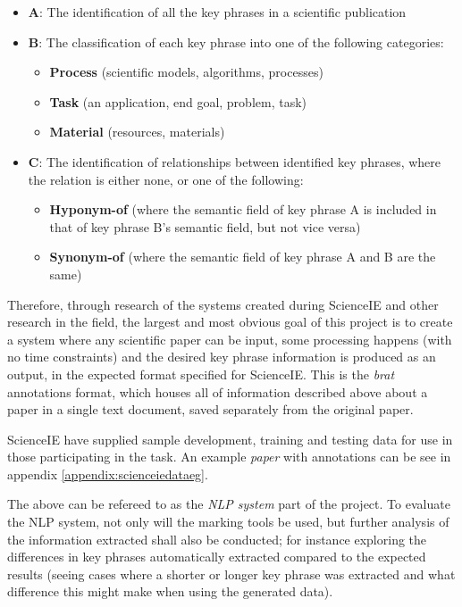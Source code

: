 \begin{itemize}
	\item \textbf{A}: The identification of all the key phrases in a scientific publication
	\item \textbf{B}: The classification of each key phrase into one of the following categories:
	\begin{itemize}
		\item \textbf{Process} (scientific models, algorithms, processes)
		\item \textbf{Task} (an application, end goal, problem, task)
		\item \textbf{Material} (resources, materials)
	\end{itemize}
	\item \textbf{C}: The identification of relationships between identified key phrases, where the relation is either none, or one of the following:
	\begin{itemize}
		\item \textbf{Hyponym-of} (where the semantic field of key phrase A is included in that of key phrase B's semantic field, but not vice versa)
		\item \textbf{Synonym-of} (where the semantic field of key phrase A and B are the same)
	\end{itemize}
\end{itemize}

Therefore, through research of the systems created during ScienceIE and other research in the field, the largest and most obvious goal of this project is to create a system where any scientific paper can be input, some processing happens (with no time constraints) and the desired key phrase information is produced as an output, in the expected format specified for ScienceIE. This is the \textit{brat} annotations format, which houses all of information described above about a paper in a single text document, saved separately from the original paper. 

ScienceIE have supplied sample development, training and testing data for use in those participating in the task. An example \textit{paper} with annotations can be see in appendix \ref{appendix:scienceiedataeg}.

The above can be refereed to as the \textit{NLP system} part of the project. To evaluate the NLP system, not only will the marking tools be used, but further analysis of the information extracted shall also be conducted; for instance exploring the differences in key phrases automatically extracted compared to the expected results (seeing cases where a shorter or longer key phrase was extracted and what difference this might make when using the generated data).


